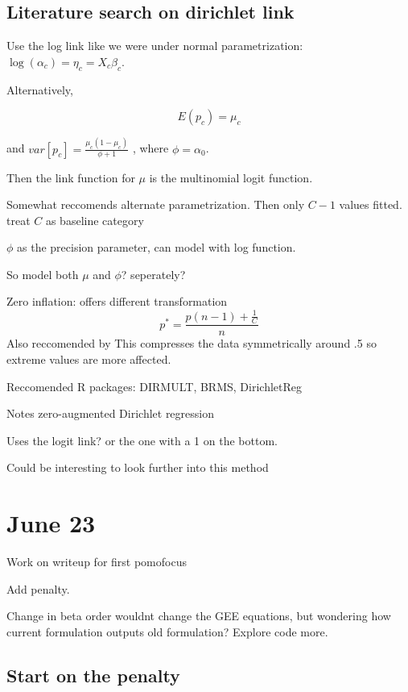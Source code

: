 \documentclass[10pt]{article}
\theoremstyle{definition}
\begin{document}
\subsection{Literature search on dirichlet link }

\cite{Douma2019a} Use the log link like we were under normal parametrization: $\log(\alpha_c) = \eta_c = X_c\beta_c$.

Alternatively,

\[E(p_c) = \mu_c \]

and $var[p_c] = \frac{\mu_c(1 - \mu_c)}{\phi+ 1}$ , where $\phi = \alpha_0$.

Then the link function for $\mu$ is the multinomial logit function.

Somewhat reccomends alternate parametrization. Then only $C-1$ values fitted. treat $C$ as baseline category

$\phi$ as the precision parameter, can model with log function.

So model both $\mu$ and $\phi$? seperately?

Zero inflation: offers different transformation
\[p^* = \frac{p(n-1) + \frac{1}{C}}{n} \]
Also reccomended by \cite{Maier2014}
This compresses the data symmetrically around .5 so extreme values are more affected.

Reccomended R packages: DIRMULT, BRMS, DirichletReg

Notes zero-augmented Dirichlet regression \cite{Tsagris2017}

Uses the logit link? or the one with a 1 on the bottom.

Could be interesting to look further into this method


\section{June 23}

\begin{todolist}
  \item Work on writeup for first pomofocus
  \item Add penalty.
\end{todolist}


Change in beta order wouldnt change the GEE equations, but wondering how current formulation outputs old formulation? Explore code more.


\subsection{Start on the penalty}
\end{document}
